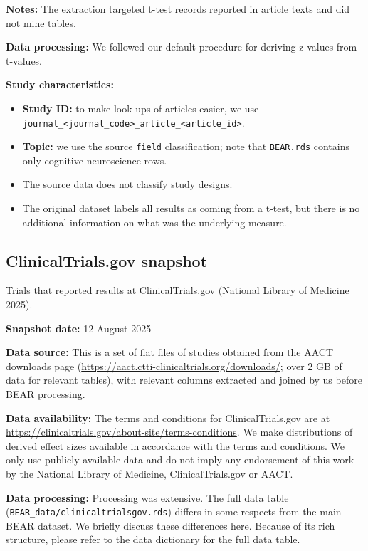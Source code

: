 \documentclass[
  11pt,
]{article}
\providecommand{\tightlist}{%
  \setlength{\itemsep}{0pt}\setlength{\parskip}{0pt}}
\begin{document}
\textbf{Notes:} The extraction targeted t-test records reported in
article texts and did not mine tables.

\textbf{Data processing:} We followed our default procedure for deriving
z-values from t-values.

\textbf{Study characteristics:}

\begin{itemize}
\tightlist
\item
  \textbf{Study ID:} to make look-ups of articles easier, we use
  \texttt{journal\_\textless{}journal\_code\textgreater{}\_article\_\textless{}article\_id\textgreater{}}.
\item
  \textbf{Topic:} we use the source \texttt{field} classification; note
  that \texttt{BEAR.rds} contains only cognitive neuroscience rows.
\item
  The source data does not classify study designs.
\item
  The original dataset labels all results as coming from a t-test, but
  there is no additional information on what was the underlying measure.
\end{itemize}

\newpage

\subsection{ClinicalTrials.gov
snapshot}\label{clinicaltrials.gov-snapshot}

Trials that reported results at ClinicalTrials.gov (National Library of
Medicine 2025).

\textbf{Snapshot date:} 12 August 2025

\textbf{Data source:} This is a set of flat files of studies obtained
from the AACT downloads page
(\url{https://aact.ctti-clinicaltrials.org/downloads/}; over 2 GB of
data for relevant tables), with relevant columns extracted and joined by
us before BEAR processing.

\textbf{Data availability:} The terms and conditions for
ClinicalTrials.gov are at
\url{https://clinicaltrials.gov/about-site/terms-conditions}. We make
distributions of derived effect sizes available in accordance with the
terms and conditions. We only use publicly available data and do not
imply any endorsement of this work by the National Library of Medicine,
ClinicalTrials.gov or AACT.

\textbf{Data processing:} Processing was extensive. The full data table
(\texttt{BEAR\_data/clinicaltrialsgov.rds}) differs in some respects
from the main BEAR dataset. We briefly discuss these differences here.
Because of its rich structure, please refer to the data dictionary for
the full data table.
\end{document}
